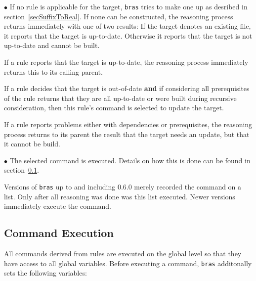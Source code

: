 \documentclass[12pt]{article}
\newcommand{\bras}{\texttt{bras}}
\begin{document}
$\bullet$ If no rule is applicable for the target, \bras{} tries to
make one up as desribed in section~\ref{secSuffixToReal}. If none can be
constructed, the reasoning process returns immediately with one of two
results: If the target denotes an existing file, it reports that the
target is up-to-date. Otherwise it reports that the target is not
up-to-date and cannot be built.

If a rule reports that the target is up-to-date,
the reasoning process immediately returns this to its calling parent.

If a rule decides that the target is out-of-date \textbf{and} if
considering all prerequisites of the rule returns that they are all
up-to-date or were built during recursive consideration, then this
rule's command is selected to update the target.

If a rule reports problems either with dependencies or
prerequisites, the reasoning process returns to its parent the result
that the target needs an update, but that it cannot be build.

$\bullet$ The selected command is executed. Details on how this is
done can be found in section~\ref{secCmdExec}.

Versions of \bras{} up to and including 0.6.0 merely recorded the
command on a list. Only after all reasoning was done was this list
executed. Newer versions immediately execute the command.

\subsection{Command Execution}
\label{secCmdExec}

All commands derived from rules are executed on the global level so
that they have access to all global variables. Before executing a
command, \bras{} additonally sets the following variables:
\end{document}
